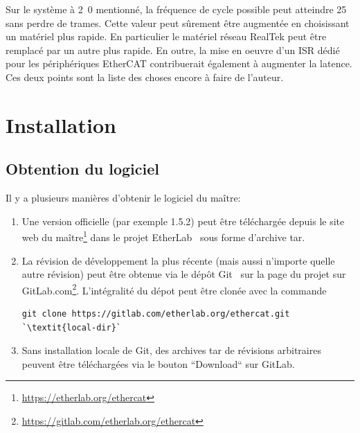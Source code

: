 \documentclass[a4paper,12pt,BCOR=6mm,bibtotoc,idxtotoc]{scrbook}
\newcommand{\masterversion}{1.5.2}
\begin{document}
Sur le syst\`eme \`a \unit{2.0}{\giga\hertz} mentionn\'e, la
fr\'equence de cycle possible peut atteindre \unit{25}{\kilo\hertz}
sans perdre de trames.  Cette valeur peut s\^urement \^etre
augment\'ee en choisissant un mat\'eriel plus rapide.  En particulier
le mat\'eriel r\'eseau RealTek peut \^etre remplac\'e par un autre
plus rapide.  En outre, la mise en oeuvre d'un ISR d\'edi\'e pour les
p\'eriph\'eriques EtherCAT contribuerait \'egalement \`a augmenter la
latence. Ces deux points sont la liste des choses encore \`a faire de
l'auteur.


\chapter{Installation}
\label{sec:installation}

\section{Obtention du logiciel}
\label{sec:getting}

Il y a plusieurs mani\`eres d'obtenir le logiciel du ma\^itre:

\begin{enumerate}

\item Une version officielle (par exemple \masterversion) peut \^etre
  t\'el\'echarg\'ee depuis le site web du
  ma\^itre\footnote{\url{https://etherlab.org/ethercat}}
  dans le projet EtherLab~\cite{etherlab} sous forme d'archive tar.

\item La r\'evision de d\'eveloppement la plus r\'ecente (mais aussi
  n'importe quelle autre r\'evision) peut \^etre obtenue via le
  d\'ep\^ot Git~\cite{git} sur la page du projet sur
  GitLab.com\footnote{\url{https://gitlab.com/etherlab.org/ethercat}}.
  L'int\'egralit\'e du d\'epot peut \^etre clon\'ee avec la commande

\begin{lstlisting}[breaklines=true]
 git clone https://gitlab.com/etherlab.org/ethercat.git `\textit{local-dir}`
\end{lstlisting}

\item Sans installation locale de Git, des archives tar de
  r\'evisions arbitraires peuvent \^etre t\'el\'echarg\'ees via le
  bouton ``Download`` sur GitLab.

\end{enumerate}
\end{document}
